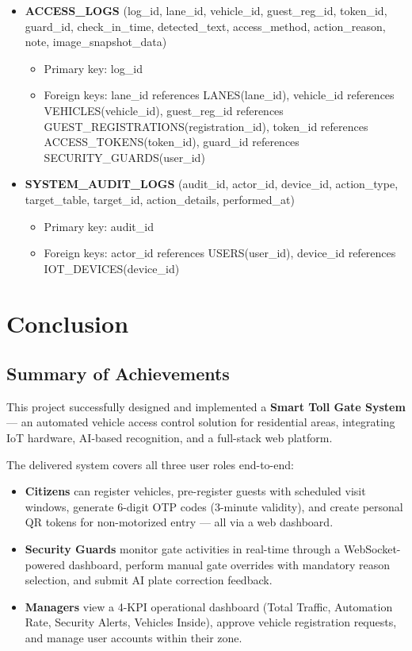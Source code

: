 \documentclass[a4paper]{article}
\begin{document}
\begin{itemize}
    \item \textbf{ACCESS\_LOGS} (log\_id, lane\_id, vehicle\_id, guest\_reg\_id, token\_id, guard\_id, check\_in\_time, detected\_text, access\_method, action\_reason, note, image\_snapshot\_data)
    \begin{itemize}
        \item Primary key: log\_id
        \item Foreign keys: lane\_id references LANES(lane\_id), vehicle\_id references VEHICLES(vehicle\_id), guest\_reg\_id references GUEST\_REGISTRATIONS(registration\_id), token\_id references ACCESS\_TOKENS(token\_id), guard\_id references SECURITY\_GUARDS(user\_id)
    \end{itemize}

    \item \textbf{SYSTEM\_AUDIT\_LOGS} (audit\_id, actor\_id, device\_id, action\_type, target\_table, target\_id, action\_details, performed\_at)
    \begin{itemize}
        \item Primary key: audit\_id
        \item Foreign keys: actor\_id references USERS(user\_id), device\_id references IOT\_DEVICES(device\_id)
    \end{itemize}
\end{itemize}

\newpage
\section*{Conclusion}

\subsection*{Summary of Achievements}

This project successfully designed and implemented a \textbf{Smart Toll Gate System} — an automated vehicle access control solution for residential areas, integrating IoT hardware, AI-based recognition, and a full-stack web platform.

The delivered system covers all three user roles end-to-end:
\begin{itemize}
    \item \textbf{Citizens} can register vehicles, pre-register guests with scheduled visit windows, generate 6-digit OTP codes (3-minute validity), and create personal QR tokens for non-motorized entry — all via a web dashboard.
    \item \textbf{Security Guards} monitor gate activities in real-time through a WebSocket-powered dashboard, perform manual gate overrides with mandatory reason selection, and submit AI plate correction feedback.
    \item \textbf{Managers} view a 4-KPI operational dashboard (Total Traffic, Automation Rate, Security Alerts, Vehicles Inside), approve vehicle registration requests, and manage user accounts within their zone.
\end{itemize}
\end{document}
